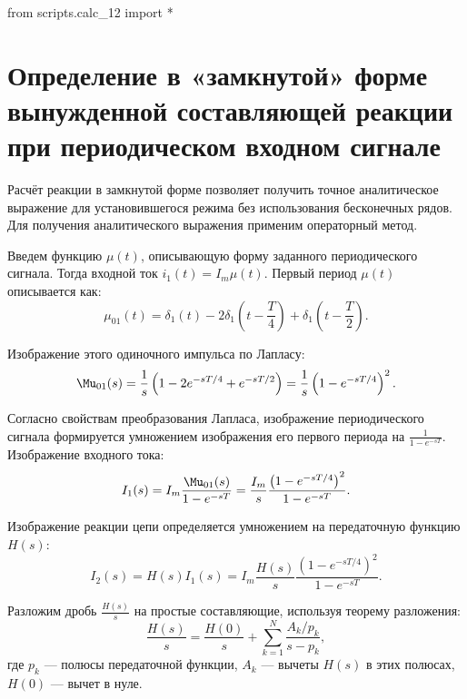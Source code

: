 \begin{python}
from scripts.calc_12 import *
\end{python}

\section{Определение в «замкнутой» форме вынужденной составляющей реакции при периодическом входном сигнале}
\label{sec:zamkn}

Расчёт реакции в замкнутой форме позволяет получить точное аналитическое выражение для установившегося режима без использования бесконечных рядов. Для получения аналитического выражения применим операторный метод. 

Введем функцию $\mu(t)$, описывающую форму заданного периодического сигнала. Тогда входной ток $i_{1}(t) = I_m \mu(t)$. Первый период $\mu(t)$ описывается как:
\begin{equation}
    \mu_{01}(t) = \delta_1(t) - 2\delta_1\left(t - \frac{T}{4}\right) + \delta_1\left(t - \frac{T}{2}\right).
\end{equation}

Изображение этого одиночного импульса по Лапласу:
\begin{equation}
    \Mu_{01}(s) = \frac{1}{s} \left( 1 - 2e^{-sT/4} + e^{-sT/2} \right) = \frac{1}{s} \left( 1 - e^{-sT/4} \right)^2.
\end{equation}

Согласно свойствам преобразования Лапласа, изображение периодического сигнала формируется умножением изображения его первого периода на $\frac{1}{1 - e^{-sT}}$. Изображение входного тока:
\begin{equation}
    I_{1}(s) = I_m \frac{\Mu_{01}(s)}{1 - e^{-sT}} = \frac{I_m}{s} \frac{\left( 1 - e^{-sT/4} \right)^2}{1 - e^{-sT}}.
\end{equation}

Изображение реакции цепи определяется умножением на передаточную функцию $H(s)$:
\begin{equation}
    I_{2}(s) = H(s) I_{1}(s) = I_m \frac{H(s)}{s} \frac{\left( 1 - e^{-sT/4} \right)^2}{1 - e^{-sT}}.
\end{equation}

Разложим дробь $\frac{H(s)}{s}$ на простые составляющие, используя теорему разложения:
\begin{equation}
    \frac{H(s)}{s} = \frac{H(0)}{s} + \sum_{k=1}^N \frac{A_k / p_k}{s - p_k},
\end{equation}
где $p_k$ — полюсы передаточной функции, $A_k$ — вычеты $H(s)$ в этих полюсах, $H(0)$ — вычет в нуле.

